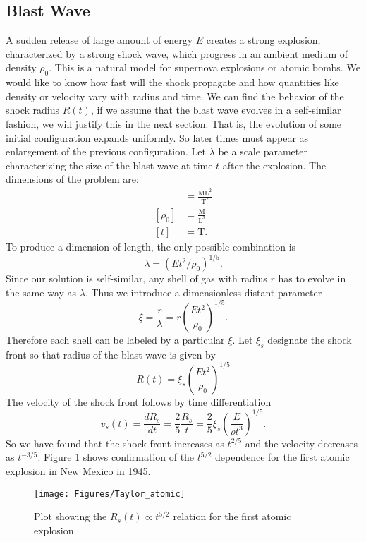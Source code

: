 \documentclass{article}
\begin{document}
\subsection{Blast Wave}
A sudden release of large amount of energy $E$ creates a strong explosion, characterized by a strong shock wave, which progress in an ambient medium of density $\rho_0$. This is a natural model for supernova explosions or atomic bombs. We would like to know how fast will the shock propagate and how quantities like density or velocity vary with radius and time. We can find the behavior of the shock radius $R(t)$, if we assume that the blast wave evolves in a self-similar fashion, we will justify this in the next section. That is, the evolution of some initial configuration expands uniformly. So later times must appear as enlargement of the previous configuration. Let $\lambda$ be a scale parameter characterizing the size of the blast wave at time $t$ after the explosion. The dimensions of the problem are:
\begin{align*}
[E] &= \mathrm{\frac{ML^2}{T^2}}\\
[\rho_0] &= \mathrm{\frac{M}{L^3}}\\
[t] &= \mathrm{T}.
\end{align*}
To produce a dimension of length, the only possible combination is
\begin{equation}
\lambda = \left(Et^2/\rho_0\right)^{1/5}.
\end{equation}
Since our solution is self-similar, any shell of gas with radius $r$ has to evolve in the same way  as $\lambda$. Thus we introduce a dimensionless distant parameter
\begin{equation}
\xi = \frac{r}{\lambda}=r\left(\frac{Et^2}{\rho_0}\right)^{1/5}.
\end{equation}
Therefore each shell can be labeled by a particular $\xi$. Let $\xi_s$ designate the shock front so that radius of the blast wave is given by
\begin{equation*}
\label{eq: shock radius}
R(t) = \xi_s \left(\frac{Et^2}{\rho_0}\right)^{1/5}
\end{equation*}
The velocity of the shock front follows by time differentiation
\begin{equation*}
v_s(t) = \frac{dR_s}{dt} = \frac{2}{5}\frac{R_s}{t} = \frac{2}{5} \xi_s \left(\frac{E}{\rho t^3}\right)^{1/5}.
\end{equation*}
So we have found that the shock front increases as $t^{2/5}$ and the velocity decreases as $t^{-3/5}$. Figure \ref{fig: Atomic Bomb} shows confirmation of the $t^{5/2}$ dependence for the first atomic explosion in New Mexico in 1945.
\begin{figure}[h!]
\begin{center}
\texttt{[image: Figures/Taylor\_atomic]}
\end{center}
\caption{Plot showing the $R_s(t) \propto t^{5/2}$ relation for the first atomic explosion.}
\label{fig: Atomic Bomb}
\end{figure}
\end{document}
